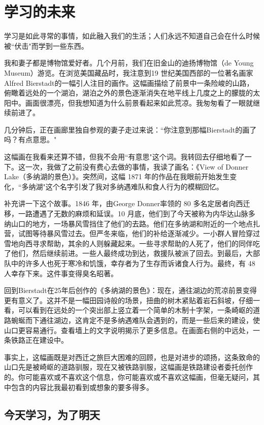 \chapter{学习的未来}
学习是如此寻常的事情，如此融入我们的生活；人们永远不知道自己会在什么时候被``伏击"而学到一些东西。

我和妻子都是博物馆爱好者。几个月前，我们在旧金山的迪扬博物馆（de Young Museum）游览。在浏览美国藏品时，我注意到19 世纪美国西部的一位著名画家Alfred Bierstadt的一幅引人注目的画作。这幅画描绘了前景中一条险峻的山路，俯瞰着远处的一个湖泊，湖泊之外的景色逐渐消失在地平线上几度之上的朦胧的太阳中。画面很漂亮，但我想知道为什么前景看起来如此荒凉。我匆匆看了一眼就继续前进了。

几分钟后，正在画廊里独自参观的妻子走过来说：``你注意到那幅Bierstadt的画了吗？有点意思。"

这幅画在我看来还算不错，但我不会用``有意思"这个词。我转回去仔细地看了一下。这一次，我做了之前没有费心去做的事情，我读了画名：《View of Donner Lake（多纳湖的景色）》。突然间，这幅 1871 年的作品在我眼前开始发生变化，``多纳湖"这个名字引发了我对多纳遇难队和食人行为的模糊回忆。

补充讲一下这个故事。1846 年，由George Donner率领的 80 多名定居者向西迁移，一路遭遇了无数的麻烦和延误。10 月底，他们到了今天被称为内华达山脉多纳山口的地方，一场暴风雪挡住了他们的去路。他们在多纳湖和附近的一个地点扎营，试图等待暴风雪过去。但严冬来临，他们的补给逐渐减少。一小群人冒险穿过雪地向西寻求帮助，其余的人则躲藏起来。一些寻求帮助的人死了，他们的同伴吃了他们，然后继续前进。一些人最终成功到达，救援队被派了回去。到最后，大部队中的许多人也死于寒冷和饥饿，幸存者为了生存而诉诸食人行为。最终，有 48 人幸存下来。这件事变得臭名昭著。

回到Bierstadt在25年后创作的《多纳湖的景色》：现在，通往湖边的荒凉前景变得更有意义了。这并不是一幅田园诗般的场景，扭曲的树木紧贴着岩石斜坡，仔细一看，可以看到在远处的一个突出部上竖立着一个简单的木制十字架，一条崎岖的道路蜿蜒而下通往湖边，这肯定不是多纳遇难队会遇到的，而是一些后来的建设，使山口更容易通行。查看墙上的文字说明揭示了更多信息。在画面右侧的中远处，一条铁路正在建设中。

事实上，这幅画既是对西迁之旅巨大困难的回顾，也是对进步的颂扬，这条致命的山口先是被崎岖的道路驯服，现在又被铁路驯服，这幅画是铁路建设者委托创作的。你可能喜欢或不喜欢这个信息，你可能喜欢或不喜欢这幅画，但毫无疑问，其中包含的内容比我最初看到或想象的要多得多。

\section*{今天学习，为了明天}

